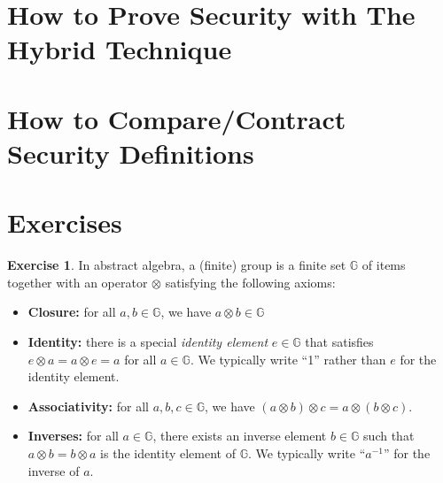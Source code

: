 \documentclass[12pt,openany]{book}
\theoremstyle{definition}
\newtheorem{exercise}{Exercise}[chapter]
\newcommand{\G}{\mathbb{G}}
\begin{document}
	\section{How to Prove Security with The Hybrid Technique}
	\section{How to Compare/Contract Security Definitions}
	
	\newpage
	\section*{Exercises}
	\begin{tcolorbox}[colback=white,colframe=execolor,arc=5pt,title={\color{white}\bf }]
		\begin{exercise}
			In abstract algebra, a (finite) group is a finite set $\mathbb{G}$ of items together with an operator $\otimes$ satisfying the following axioms:
			\begin{itemize}
				\item \textbf{Closure:} for all \(a,b\in\mathbb{G}\), we have $a\otimes b\in \mathbb{G}$
				\item \textbf{Identity:} there is a special \textit{identity element} $e\in\G$ that satisfies \(e\otimes a = a\otimes e = a\) for
				all \(a\in\G\). We typically write ``1'' rather than $e$ for the identity element.
				\item \textbf{Associativity:} for all \(a, b, c\in\G\), we have \((a\otimes b)\otimes c = a\otimes (b\otimes c)\).
				\item \textbf{Inverses:} for all \(a\in\G\), there exists an inverse element \(b\in\G\) such that \(a\otimes b = b\otimes a\)
				is the identity element of $\G$. We typically write ``$a^{-1}$'' for the inverse of $a$.
			\end{itemize}
			

\end{exercise}
\end{tcolorbox}
\end{document}
